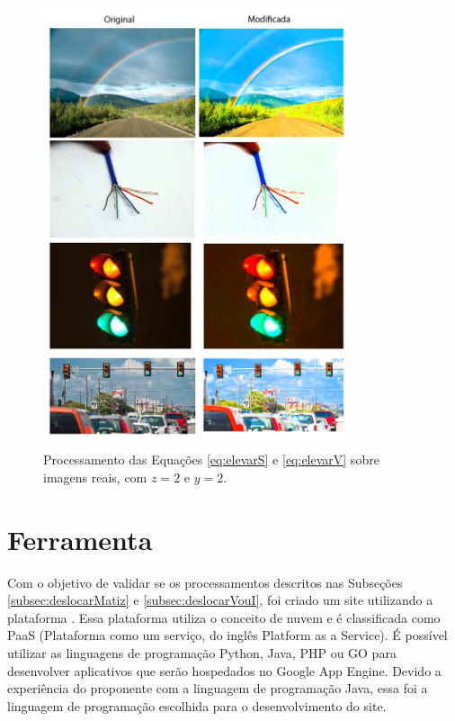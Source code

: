 \documentclass[	12pt, Times, openright, twoside, a4paper, english, brazil]{abntex2}
\begin{document}
\begin{figure}[!htb]
\centering \includegraphics[width=0.80\textwidth]{figuraRealSeV.jpg}
\caption{Processamento das Equações \ref{eq:elevarS} e \ref{eq:elevarV} sobre imagens reais, com $z = 2$ e $y = 2$. \label{fig:figuraRealVeS}}
\end{figure}

\section{Ferramenta}

Com o objetivo de validar se os processamentos descritos nas Subseções \ref{subsec:deslocarMatiz} e \ref{subsec:deslocarVouI}, foi criado um site utilizando a plataforma . Essa plataforma utiliza o conceito de nuvem e é classificada como PaaS (Plataforma como um serviço, do inglês Platform as a Service). É possível utilizar as linguagens de programação Python, Java, PHP ou GO para desenvolver aplicativos que serão hospedados no Google App Engine. Devido a experiência do proponente com a linguagem de programação Java, essa foi a linguagem de programação escolhida para o desenvolvimento do site. 
\end{document}
